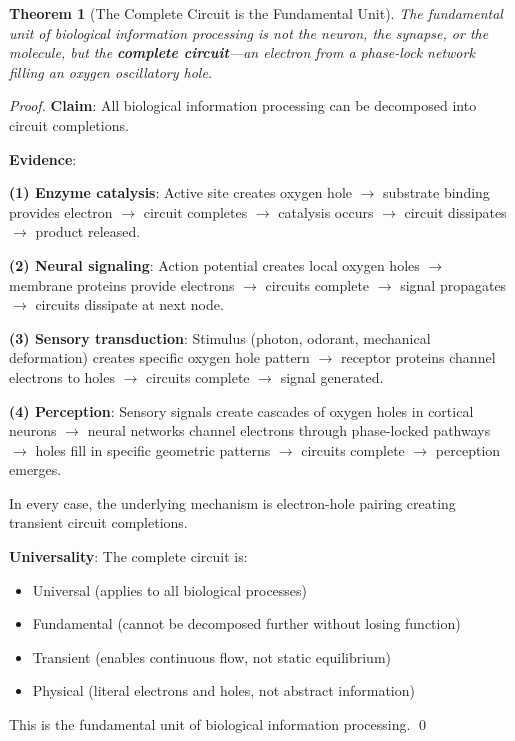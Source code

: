 \documentclass[12pt,a4paper]{article}
\newtheorem{theorem}{Theorem}
\begin{document}
\begin{theorem}[The Complete Circuit is the Fundamental Unit]
\label{thm:complete_circuit_unit}
The fundamental unit of biological information processing is not the neuron, the synapse, or the molecule, but the \textbf{complete circuit}—an electron from a phase-lock network filling an oxygen oscillatory hole.
\end{theorem}

\begin{proof}
\textbf{Claim}: All biological information processing can be decomposed into circuit completions.

\textbf{Evidence}:

\textbf{(1) Enzyme catalysis}: Active site creates oxygen hole $\to$ substrate binding provides electron $\to$ circuit completes $\to$ catalysis occurs $\to$ circuit dissipates $\to$ product released.

\textbf{(2) Neural signaling}: Action potential creates local oxygen holes $\to$ membrane proteins provide electrons $\to$ circuits complete $\to$ signal propagates $\to$ circuits dissipate at next node.

\textbf{(3) Sensory transduction}: Stimulus (photon, odorant, mechanical deformation) creates specific oxygen hole pattern $\to$ receptor proteins channel electrons to holes $\to$ circuits complete $\to$ signal generated.

\textbf{(4) Perception}: Sensory signals create cascades of oxygen holes in cortical neurons $\to$ neural networks channel electrons through phase-locked pathways $\to$ holes fill in specific geometric patterns $\to$ circuits complete $\to$ perception emerges.

In every case, the underlying mechanism is electron-hole pairing creating transient circuit completions.

\textbf{Universality}: The complete circuit is:
\begin{itemize}
\item Universal (applies to all biological processes)
\item Fundamental (cannot be decomposed further without losing function)
\item Transient (enables continuous flow, not static equilibrium)
\item Physical (literal electrons and holes, not abstract information)
\end{itemize}

This is the fundamental unit of biological information processing. \qed
\end{proof}
\end{document}
